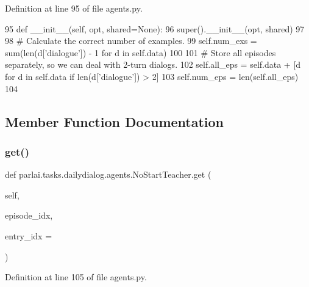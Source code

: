 Definition at line 95 of file agents.\+py.


\begin{DoxyCode}
95     \textcolor{keyword}{def }\_\_init\_\_(self, opt, shared=None):
96         super().\_\_init\_\_(opt, shared)
97 
98         \textcolor{comment}{# Calculate the correct number of examples.}
99         self.num\_exs = sum(len(d[\textcolor{stringliteral}{'dialogue'}]) - 1 \textcolor{keywordflow}{for} d \textcolor{keywordflow}{in} self.data)
100 
101         \textcolor{comment}{# Store all episodes separately, so we can deal with 2-turn dialogs.}
102         self.all\_eps = self.data + [d \textcolor{keywordflow}{for} d \textcolor{keywordflow}{in} self.data \textcolor{keywordflow}{if} len(d[\textcolor{stringliteral}{'dialogue'}]) > 2]
103         self.num\_eps = len(self.all\_eps)
104 
\end{DoxyCode}


\subsection{Member Function Documentation}
\mbox{\label{classparlai_1_1tasks_1_1dailydialog_1_1agents_1_1NoStartTeacher_a9ba392a1d4730fdd27f275d0f19c7149}} 
\subsubsection{\texorpdfstring{get()}{get()}}
{\footnotesize\ttfamily def parlai.\+tasks.\+dailydialog.\+agents.\+No\+Start\+Teacher.\+get (\begin{DoxyParamCaption}\item[{}]{self,  }\item[{}]{episode\+\_\+idx,  }\item[{}]{entry\+\_\+idx = {} }\end{DoxyParamCaption})}



Definition at line 105 of file agents.\+py.


